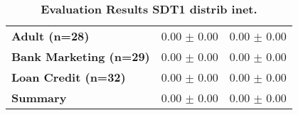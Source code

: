 \begin{table}[htb]
{\begin{tabular}{lll}
\textbf{Adult (n=28)                             } &  \phantom{0}0.00 $\pm$ \phantom{0}0.00 &             \phantom{0}0.00 $\pm$ \phantom{0}0.00 \\
\textbf{Bank Marketing (n=29)                    } &  \phantom{0}0.00 $\pm$ \phantom{0}0.00 &             \phantom{0}0.00 $\pm$ \phantom{0}0.00 \\
\textbf{Loan Credit (n=32)                       } &  \phantom{0}0.00 $\pm$ \phantom{0}0.00 &             \phantom{0}0.00 $\pm$ \phantom{0}0.00 \\
\midrule
\textbf{Summary                                  } &  \phantom{0}0.00 $\pm$ \phantom{0}0.00 &             \phantom{0}0.00 $\pm$ \phantom{0}0.00 \\
\bottomrule
\end{tabular}%
}
\caption{\textbf{Evaluation Results SDT1 distrib inet.}}
\label{tab:eval-results}
\end{table}


